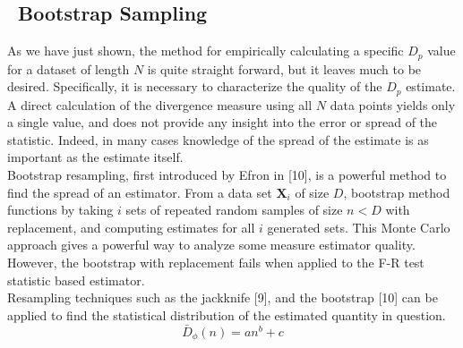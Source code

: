 \documentclass{article}
\begin{document}
	\subsection{\ Bootstrap Sampling}
	\indent	As we have just shown, the method for empirically calculating a specific $D_p$ value for a dataset of length $N$ is quite straight forward, but it leaves much to be desired. Specifically, it is necessary to characterize the quality of the $D_p$ estimate. A direct calculation of the divergence measure using all $N$ data points yields only a single value, and does not provide any insight into the error or spread of  the statistic. Indeed, in many cases knowledge of the spread of the estimate is as important as the estimate itself.
	\\[0.5ex]
	\indent Bootstrap resampling, first introduced by Efron in [10], is a powerful method to find the spread of an estimator. From a data set $\textbf{X}_i$ of size $D$, bootstrap method functions by taking $i$ sets of repeated random samples of size $n<D$ with replacement, and computing estimates for all $i$ generated sets. This Monte Carlo approach gives a powerful way to analyze some measure estimator quality. However, the bootstrap with replacement fails when applied to the F-R test statistic based estimator.
	\\ [0.5ex]
	 Resampling techniques such as the jackknife [9], and the bootstrap [10] can be applied to find the statistical distribution of the estimated quantity in question. 
	\\ [0.5ex]

	\begin{equation}
	\bar{D}_\phi(n)=an^b+c
	\end{equation}
	
\end{document}
